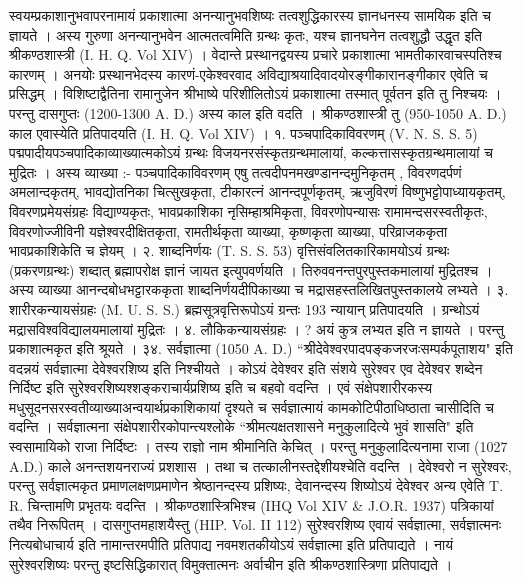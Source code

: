 स्वयम्प्रकाशानुभवापरनामायं प्रकाशात्मा अनन्यानुभवशिष्यः तत्वशुद्धिकारस्य ज्ञानधनस्य सामयिक इति च ज्ञायते । अस्य गुरुणा अनन्यानुभवेन आत्मतत्वमिति ग्रन्थः कृतः, यश्च ज्ञानघनेन तत्वशुद्धौ उद्धृत इति श्रीकण्ठशास्त्री (I. H. Q. Vol XIV) ।
वेदान्ते प्रस्थानद्वयस्य प्रचारे प्रकाशात्मा भामतीकारवाचस्पतिश्च कारणम् । अनयोः प्रस्थानभेदस्य कारणं-एकेश्वरवाद अविद्याश्रयादिवादयोरङ्गीकारानङ्गीकार एवेति च प्रसिद्धम् ।
विशिष्टाद्वैतिना रामानुजेन श्रीभाष्ये परिशीलितोऽयं प्रकाशात्मा तस्मात् पूर्वतन इति तु निश्चयः । परन्तु दासगुप्तः (1200-1300 A. D.) अस्य काल इति वदति । श्रीकण्ठशास्त्री तु (950-1050 A. D.) काल एवास्येति प्रतिपादयति (I. H. Q. Vol XIV) ।
१. पञ्चपादिकाविवरणम् (V. N. S. S. 5)
पद्मपादीयपञ्चपादिकाव्याख्यात्मकोऽयं ग्रन्थः विजयनरसंस्कृतग्रन्थमालायां, कल्कत्तासस्कृतग्रन्थमालायां च मुद्रितः ।
अस्य व्याख्या :-
पञ्चपादिकाविवरणम्
एषु तत्वदीपनमखण्डानन्दमुनिकृतम् , विवरणदर्पणं अमलान्दकृतम्, भावद्योतनिका चित्सुखकृता, टीकारत्नं आनन्दपूर्णकृतम्, ऋजुविरणं विष्णुभट्टोपाध्यायकृतम्, विवरणप्रमेयसंग्रहः विद्याण्यकृतः, भावप्रकाशिका नृसिम्हाश्रमिकृता, विवरणोपन्यासः रामामन्दसरस्वतीकृतः, विवरणोज्जीविनी यज्ञेश्वरदीक्षितकृता, रामतीर्थकृता व्याख्या, कृष्णकृता व्याख्या, परिव्राजककृता भावप्रकाशिकेति च ज्ञेयम् ।
२. शाब्दनिर्णयः (T. S. S. 53)
वृत्तिसंवलितकारिकामयोऽयं ग्रन्थः (प्रकरणग्रन्थः) शब्दात् ब्रह्मापरोक्ष ज्ञानं जायत इत्युपवर्णयति । तिरुववनन्तपुरपुस्तकमालायां मुद्रितश्च । अस्य व्याख्या आनन्दबोधभट्टारककृता शाब्दनिर्णयदीपिकाख्या च मद्रासहस्तलिखितपुस्तकालये लभ्यते ।
३. शारीरकन्यायसंग्रहः (M. U. S. S.)
ब्रह्मसूत्रवृत्तिरूपोऽयं ग्रन्तः 193 न्यायान् प्रतिपादयति । ग्रन्थोऽयं मद्रासविश्वविद्यालयमालायां मुद्रितः ।
४. लौकिकन्यायसंग्रहः । ? अयं कुत्र लभ्यत इति न ज्ञायते । परन्तु प्रकाशात्मकृत इति श्रूयते ।
३४. सर्वज्ञात्मा (1050 A. D.)
``श्रीदेवेश्वरपादपङ्कजरजःसम्पर्कपूताशय" इति वदन्नयं सर्वज्ञात्मा देवेश्वरशिष्य इति निश्चीयते । कोऽयं देवेश्वर इति संशये सुरेश्वर एव देवेश्वर शब्देन निर्दिष्ट इति सुरेश्वरशिष्यश्शङ्कराचार्यप्रशिष्य इति च बहवो वदन्ति । एवं संक्षेपशारीरकस्य मधुसूदनसरस्वतीव्याख्याअन्वयार्थप्रकाशिकायां दृश्यते च सर्वज्ञात्मायं कामकोटिपीठाधिष्ठाता चासीदिति च वदन्ति ।
सर्वज्ञात्मना संक्षेपशारीरकोपान्त्यश्लोके ``श्रीमत्यक्षतशासने मनुकुलादित्ये भुवं शासति" इति स्वसामायिको राजा निर्दिष्टः । तस्य राज्ञो नाम श्रीमानिति केचित् । परन्तु मनुकुलादित्यनामा राजा (1027 A.D.) काले अनन्तशयनराज्यं प्रशशास । तथा च तत्कालीनस्तद्देशीयश्चेति वदन्ति ।
देवेश्वरो न सुरेश्वरः, परन्तु सर्वज्ञात्मकृत प्रमाणलक्षणप्रमाणेन श्रेष्ठानन्दस्य प्रशिष्यः, देवानन्दस्य शिष्योऽयं देवेश्वर अन्य एवेति T. R. चिन्तामणि प्रभृतयः वदन्ति । श्रीकण्ठशास्त्रिभिश्च (IHQ Vol XIV & J.O.R. 1937) पत्रिकायां तथैव निरूपितम् ।
दासगुप्तमहाशयैस्तु (HIP. Vol. II 112) सुरेश्वरशिष्य एवायं सर्वज्ञात्मा, सर्वज्ञात्मनः नित्यबोधाचार्य इति नामान्तरमपीति प्रतिपाद्य नवमशतकीयोऽयं सर्वज्ञात्मा इति प्रतिपाद्यते । नायं सुरेश्वरशिष्यः परन्तु इष्टसिद्धिकारात् विमुक्तात्मनः अर्वाचीन इति श्रीकण्ठशास्त्रिणा प्रतिपाद्यते ।
